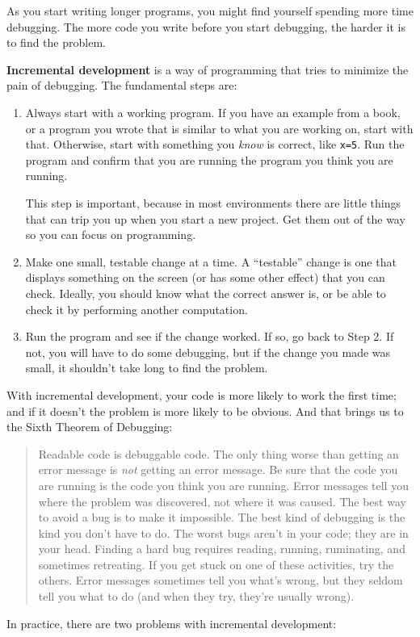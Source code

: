 \documentclass[
]{book}
\numberwithin{Answer}{chapter}
\numberwithin{Exercise}{chapter}
\newcommand{\displaythrm}[1]{%
    \ifthenelse{\equal{#1}{1}}%
        {Readable code is debuggable code.}{%
    \ifthenelse{\equal{#1}{2}}%
        {The only thing worse than getting an error message is {\em
         not} getting an error message.}{%
    \ifthenelse{\equal{#1}{3}}%
        {Be sure that the code you are running
         is the code you think you are running.}{%
    \ifthenelse{\equal{#1}{4}}%
        {Error messages tell you where the problem was discovered,
         not where it was caused.}{%
    \ifthenelse{\equal{#1}{5}}%
        {The best way to avoid a bug is to make it impossible.}{%
    \ifthenelse{\equal{#1}{6}}%
        {The best kind of debugging is the kind you don't have to do.}{%
    \ifthenelse{\equal{#1}{7}}%
        {The worst bugs aren't in your code; they are in your head.}{%
    \ifthenelse{\equal{#1}{8}}%
        {Finding a hard bug requires reading, running, ruminating,
         and sometimes retreating.  If you get stuck on one of these
         activities, try the others.}{%
    \ifthenelse{\equal{#1}{9}}%
        {Error messages sometimes tell you what's wrong, but they
         seldom tell you what to do (and when they try, they're usually
         wrong).}{%
    {}%
}}}}}}}}}}%
\begin{document}

As you start writing longer programs, you might find yourself spending more time debugging.
The more code you write before you start debugging, the harder it is to find
the problem.

{\bf Incremental development} is a way of programming that tries
to minimize the pain of debugging.  The fundamental steps are:

\begin{enumerate}

\item Always start with a working program.  If you have an
example from a book, or a program you wrote that is similar to
what you are working on, start with that.  Otherwise, start with
something you {\em know} is correct, like {\tt x=5}.  Run the program
and confirm that you are running the program you think you are
running.

This step is important, because in most environments there
are little things that can trip you up when you start a new
project.  Get them out of the way so you can focus on programming.

\item Make one small, testable change at a time.  A ``testable''
change is one that displays something on the screen (or has some
other effect) that you can check.  Ideally, you should know what
the correct answer is, or be able to check it by performing another
computation.

\item Run the program and see if the change worked.  If so, go back
to Step 2.  If not, you will have to do some debugging, but if the
change you made was small, it shouldn't take long to find the problem.

\end{enumerate}


With incremental development, your code is more likely to work the first time; and if it doesn't the problem is more likely to be obvious.  And that brings us to the Sixth Theorem of Debugging:

\begin{quote}
\displaythrm{6}
\end{quote}

In practice, there are two problems with incremental development:
\end{document}
